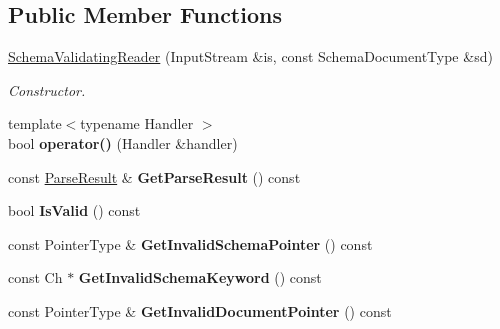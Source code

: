 \subsection*{Public Member Functions}
\begin{DoxyCompactItemize}
\item 
\hyperlink{class_schema_validating_reader_ae7945b71687ad3dd13b9c3d096892eac}{Schema\+Validating\+Reader} (Input\+Stream \&is, const Schema\+Document\+Type \&sd)
\begin{DoxyCompactList}\small\item\em Constructor. \end{DoxyCompactList}\item 
{\footnotesize template$<$typename Handler $>$ }\\bool {\bfseries operator()} (Handler \&handler)\hypertarget{class_schema_validating_reader_a7135d8d53aacd850fbce2901cca4a4c3}{}\label{class_schema_validating_reader_a7135d8d53aacd850fbce2901cca4a4c3}

\item 
const \hyperlink{struct_parse_result}{Parse\+Result} \& {\bfseries Get\+Parse\+Result} () const \hypertarget{class_schema_validating_reader_aa5445bcfe27eaa55b28961a0ad6e86c1}{}\label{class_schema_validating_reader_aa5445bcfe27eaa55b28961a0ad6e86c1}

\item 
bool {\bfseries Is\+Valid} () const \hypertarget{class_schema_validating_reader_a01576a2c4ee21a6c73071e5f445dc0bd}{}\label{class_schema_validating_reader_a01576a2c4ee21a6c73071e5f445dc0bd}

\item 
const Pointer\+Type \& {\bfseries Get\+Invalid\+Schema\+Pointer} () const \hypertarget{class_schema_validating_reader_aaf450fe1f71af00a783d197e81ec6786}{}\label{class_schema_validating_reader_aaf450fe1f71af00a783d197e81ec6786}

\item 
const Ch $\ast$ {\bfseries Get\+Invalid\+Schema\+Keyword} () const \hypertarget{class_schema_validating_reader_ac040fa8a06b5950b40f907cc5fbec201}{}\label{class_schema_validating_reader_ac040fa8a06b5950b40f907cc5fbec201}

\item 
const Pointer\+Type \& {\bfseries Get\+Invalid\+Document\+Pointer} () const \hypertarget{class_schema_validating_reader_a8e5fb64a2b4c76572501c3b3e611e0fb}{}\label{class_schema_validating_reader_a8e5fb64a2b4c76572501c3b3e611e0fb}


\end{DoxyCompactItemize}
